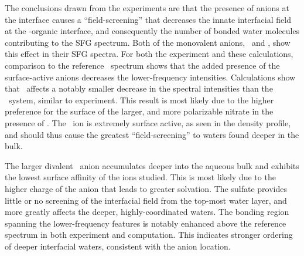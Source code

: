 The conclusions drawn from the experiments are that the presence of anions at the interface causes a ``field-screening'' that decreases the innate interfacial field at the \wat-organic interface, and consequently the number of bonded water molecules contributing to the SFG spectrum. Both of the monovalent anions, \cl~and \nit, show this effect in their SFG spectra. For both the experiment and these calculations, comparison to the reference \ctcwat~spectrum shows that the added presence of the surface-active anions decreases the lower-frequency intensities. Calculations show that \cl~affects a notably smaller decrease in the spectral intensities than the \nit~system, similar to experiment. This result is most likely due to the higher preference for the surface of the larger, and more polarizable nitrate in the presence of \ctc. The \nit~ion is extremely surface active, as seen in the density profile, and should thus cause the greatest ``field-screening'' to waters found deeper in the bulk.

The larger divalent \sul~anion accumulates deeper into the aqueous bulk and exhibits the lowest surface affinity of the ions studied. This is most likely due to the higher charge of the anion that leads to greater solvation. The sulfate provides little or no screening of the interfacial field from the top-most water layer, and more greatly affects the deeper, highly-coordinated waters. The bonding region spanning the lower-frequency features is notably enhanced above the reference spectrum in both experiment and computation. This indicates stronger ordering of deeper interfacial waters, consistent with the anion location.

